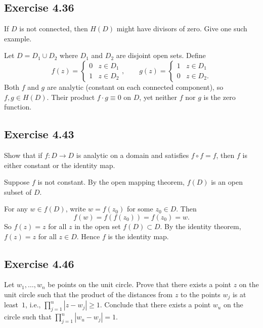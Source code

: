 \documentclass{article}
\begin{document}
\subsection{Exercise 4.36}

If $D$ is not connected, then $H(D)$ might have divisors of zero.
Give one such example.

\begin{solution}
  Let $D = D_1 \cup D_2$ where $D_1$ and $D_2$ are disjoint open
  sets. Define
  \[
    f(z) = \begin{cases} 0 & z \in D_1 \\ 1 & z \in D_2 \end{cases},
    \qquad
    g(z) = \begin{cases} 1 & z \in D_1 \\ 0 & z \in D_2. \end{cases}
  \]
  Both $f$ and $g$ are analytic (constant on each connected component),
  so $f, g \in H(D)$. Their product $f \cdot g \equiv 0$ on $D$,
  yet neither $f$ nor $g$ is the zero function.
\end{solution}

\subsection{Exercise 4.43}
\label{sec:ca-ex-4-43}

Show that if $f : D \to D$ is analytic on a domain and satisfies
$f \circ f = f$, then $f$ is either constant or the identity map.

\begin{solution}
  Suppose $f$ is not constant. By the open mapping theorem,
  $f(D)$ is an open subset of $D$.

  For any $w \in f(D)$, write $w = f(z_0)$ for some $z_0 \in D$.
  Then
  \[
    f(w) = f(f(z_0)) = f(z_0) = w.
  \]
  So $f(z) = z$ for all $z$ in the open set $f(D) \subset D$.
  By the identity theorem, $f(z) = z$ for all $z \in D$.
  Hence $f$ is the identity map.
\end{solution}

\subsection{Exercise 4.46}
\label{sec:ca-ex-4-46}

Let $w_1, \ldots, w_n$ be points on the unit circle.
Prove that there exists a point $z$ on the unit circle such that
the product of the distances from $z$ to the points $w_j$ is at
least~$1$, i.e.,
$\prod_{j=1}^{n} |z - w_j| \ge 1$.
Conclude that there exists a point $w_u$ on the circle such that
$\prod_{j=1}^{n} |w_u - w_j| = 1$.
\end{document}
